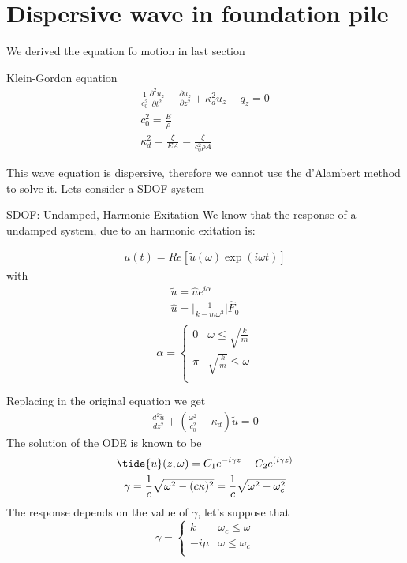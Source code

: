 \documentclass[a4paper, 11pt,article,oneside]{memoir}%
\begin{document}
\section{Dispersive wave in foundation pile}
We derived the equation fo motion in last section
\begin{eqbox2}{}{Klein-Gordon equation}
\begin{gather*}
\frac{1}{c^2_0}\frac{\partial^2u_z}{\partial t^2}-\frac{\partial u_z}{\partial z^2}+\kappa_d^2u_z-q_z=0\\
c^2_0=\frac{E}{\rho}\\
\kappa^2_d=\frac{\xi}{EA}=\frac{\xi}{c^2_0\rho A}
\end{gather*}
\end{eqbox2}
This wave equation is dispersive, therefore we cannot use the d'Alambert method to solve it. 
Lets consider a SDOF system
\begin{eqbox2}{}{SDOF: Undamped, Harmonic Exitation}
We know that the response of a undamped system, due to an harmonic exitation is:

\begin{gather*}
u(t)=Re[\tilde{u}(\omega)\exp(i\omega t)]
\end{gather*}
with 
\begin{gather*}
\tilde{u}=\hat{u} e^{i\alpha}\\
\hat{u}=\vert \frac{1}{k-m\omega^2}\vert \hat{F}_0\\
\end{gather*} 
\[\alpha = \begin{cases} 
          0 & \omega\leq \sqrt{\frac{k}{m}} \\
          \pi &\sqrt{\frac{k}{m}}\leq \omega \\
       \end{cases}
    \] 
\end{eqbox2}
Replacing in the original equation we get 
\begin{gather*}
\frac{d^2\tilde{u}}{dz^2}+\left(\frac{\omega^2}{c_0^2}-\kappa_d\right)\tilde{u}=0
\end{gather*}
The solution of the ODE is known to be 
\begin{gather*}
\tide{u}(z,\omega)=C_1e^{-i\gamma z} +C_2e^{(i\gamma z)}\\
\gamma=\frac{1}{c}\sqrt{\omega^2-(c\kappa)^2}=\frac{1}{c}\sqrt{\omega^2-\omega_c^2}
\end{gather*}
The response depends on the value of $\gamma$, let's suppose that 
\[\gamma = \begin{cases} 
          k  & \omega_c\leq \omega \\
          -i\mu &\omega\leq \omega_c \\
       \end{cases}
    \] 
    
\end{document}
